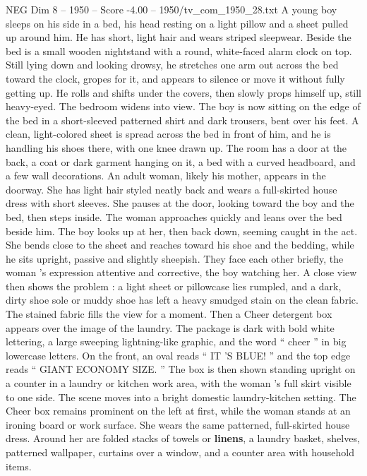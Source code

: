 \begin{textsample}{NEG Dim 8 – 1950 – Score -4.00 – 1950/tv\_com\_1950\_28.txt}  \label{ex:f8_neg_021}
A young boy sleeps on his side in a bed, his head resting on a light pillow and a sheet pulled up around him.
He has short, light hair and wears striped sleepwear.
Beside the bed is a small wooden nightstand with a round, white-faced alarm clock on top.
Still lying down and looking drowsy, he stretches one arm out across the bed toward the clock, gropes for it, and appears to silence or move it without fully getting up.
He rolls and shifts under the covers, then slowly props himself up, still heavy-eyed.
The bedroom widens into view.
The boy is now sitting on the edge of the bed in a short-sleeved patterned shirt and dark trousers, bent over his feet.
A clean, light-colored sheet is spread across the bed in front of him, and he is handling his shoes there, with one knee drawn up.
The room has a door at the back, a coat or dark garment hanging on it, a bed with a curved headboard, and a few wall decorations.
An adult woman, likely his mother, appears in the doorway.
She has light hair styled neatly back and wears a full-skirted house dress with short sleeves.
She pauses at the door, looking toward the boy and the bed, then steps inside.
The woman approaches quickly and leans over the bed beside him.
The boy looks up at her, then back down, seeming caught in the act.
She bends close to the sheet and reaches toward his shoe and the bedding, while he sits upright, passive and slightly sheepish.
They face each other briefly, the woman ’s expression attentive and corrective, the boy watching her.
A close view then shows the problem : a light sheet or pillowcase lies rumpled, and a dark, dirty shoe sole or muddy shoe has left a heavy smudged stain on the clean fabric.
The stained fabric fills the view for a moment.
Then a Cheer detergent box appears over the image of the laundry.
The package is dark with bold white lettering, a large sweeping lightning-like graphic, and the word “ cheer ” in big lowercase letters.
On the front, an oval reads “ IT ’S BLUE! ” and the top edge reads “ GIANT ECONOMY SIZE. ” The box is then shown standing upright on a counter in a laundry or kitchen work area, with the woman ’s full skirt visible to one side.
The scene moves into a bright domestic laundry-kitchen setting.
The Cheer box remains prominent on the left at first, while the woman stands at an ironing board or work surface.
She wears the same patterned, full-skirted house dress.
Around her are folded stacks of towels or \textbf{linens}, a laundry basket, shelves, patterned wallpaper, curtains over a window, and a counter area with household items.

\end{textsample}
